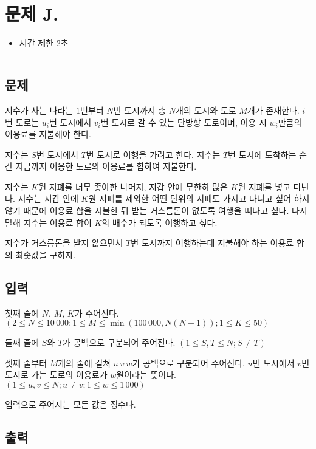 \newpage
\section*{{\Large 문제 J.} }

\begin{itemize}
    \item 시간 제한 \tabto{2cm} 2초
\end{itemize}

\hrule

\subsection*{문제}

지수가 사는 나라는 $1$번부터 $N$번 도시까지 총 $N$개의 도시와 도로 $M$개가 존재한다. $i$번 도로는 $u_{i}$번 도시에서 $v_{i}$번 도시로 갈 수 있는 단방향 도로이며, 이용 시 $w_{i}$만큼의 이용료를 지불해야 한다.

지수는 $S$번 도시에서 $T$번 도시로 여행을 가려고 한다. 지수는 $T$번 도시에 도착하는 순간 지금까지 이용한 도로의 이용료를 합하여 지불한다.

지수는 $K$원 지폐를 너무 좋아한 나머지, 지갑 안에 무한히 많은 $K$원 지폐를 넣고 다닌다. 지수는 지갑 안에 $K$원 지폐를 제외한 어떤 단위의 지폐도 가지고 다니고 싶어 하지 않기 때문에 이용료 합을 지불한 뒤 받는 거스름돈이 없도록 여행을 떠나고 싶다. 다시 말해 지수는 이용료 합이 $K$의 배수가 되도록 여행하고 싶다.

지수가 거스름돈을 받지 않으면서 $T$번 도시까지 여행하는데 지불해야 하는 이용료 합의 최솟값을 구하자.

\subsection*{입력}

첫째 줄에 $N$, $M$, $K$가 주어진다. $(2\leq N\leq 10\,000; 1\leq M\leq \min\left(100\,000, N(N-1)\right); 1\leq K\leq 50)$

둘째 줄에 $S$와 $T$가 공백으로 구분되어 주어진다. $(1\leq S,T\leq N;S\neq T)$

셋째 줄부터 $M$개의 줄에 걸쳐 $u\ v\ w$가 공백으로 구분되어 주어진다. $u$번 도시에서 $v$번 도시로 가는 도로의 이용료가 $w$원이라는 뜻이다. $(1 \leq u,v \leq N; u\neq v; 1\leq w \leq 1\,000)$

입력으로 주어지는 모든 값은 정수다.

\subsection*{출력}

